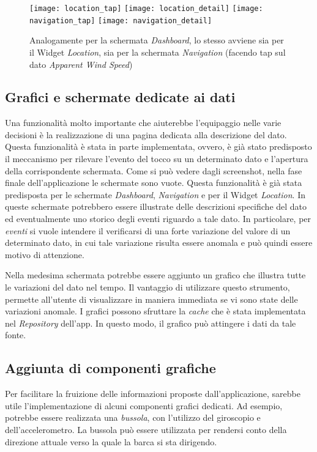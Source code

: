 \begin{figure}[htp]
	\centering
	\texttt{[image: location\_tap]}
	\texttt{[image: location\_detail]}
	\texttt{[image: navigation\_tap]}
	\texttt{[image: navigation\_detail]}
	\caption[Sviluppi futuri - Location e Navigation]{Analogamente per la schermata \textit{Dashboard}, lo stesso avviene sia per il Widget \textit{Location}, sia per la schermata \textit{Navigation} (facendo tap sul dato \textit{Apparent Wind Speed})}\label{xyz}
\end{figure}

\subsection{Grafici e schermate dedicate ai dati}
Una funzionalità molto importante che aiuterebbe l'equipaggio nelle varie decisioni è la realizzazione di una pagina dedicata alla descrizione del dato. Questa funzionalità è stata in parte implementata, ovvero, è già stato predisposto il meccanismo per rilevare l'evento del tocco su un determinato dato e l'apertura della corrispondente schermata. Come si può vedere dagli screenshot, nella fase finale dell'applicazione le schermate sono vuote. Questa funzionalità è già stata predisposta per le schermate \textit{Dashboard}, \textit{Navigation} e per il Widget \textit{Location}. In queste schermate potrebbero essere illustrate delle descrizioni specifiche del dato ed eventualmente uno storico degli eventi riguardo a tale dato. In particolare, per \textit{eventi} si vuole intendere il verificarsi di una forte variazione del valore di un determinato dato, in cui tale variazione risulta essere anomala e può quindi essere motivo di attenzione.

Nella medesima schermata potrebbe essere aggiunto un grafico che illustra tutte le variazioni del dato nel tempo. Il vantaggio di utilizzare questo strumento, permette all'utente di visualizzare in maniera immediata se vi sono state delle variazioni anomale. I grafici possono sfruttare la \textit{cache} che è stata implementata nel \textit{Repository} dell'app. In questo modo, il grafico può attingere i dati da tale fonte.

\subsection{Aggiunta di componenti grafiche}
Per facilitare la fruizione delle informazioni proposte dall'applicazione, sarebbe utile l'implementazione di alcuni componenti grafici dedicati. Ad esempio, potrebbe essere realizzata una \textit{bussola}, con l'utilizzo del giroscopio e dell'accelerometro. La bussola può essere utilizzata per rendersi conto della direzione attuale verso la quale la barca si sta dirigendo.

